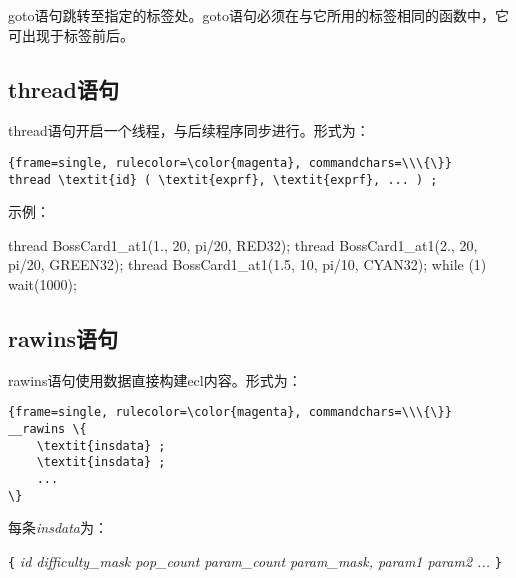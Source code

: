 \documentclass{article}
\begin{document}
goto语句跳转至指定的标签处。goto语句必须在与它所用的标签相同的函数中，它可出现于标签前后。

\subsection{thread语句}

thread语句开启一个线程，与后续程序同步进行。形式为：

\begin{Verbatim}{frame=single, rulecolor=\color{magenta}, commandchars=\\\{\}}
thread \textit{id} ( \textit{exprf}, \textit{exprf}, ... ) ;
\end{Verbatim}

示例：

\begin{MUAvbt}
thread BossCard1_at1(1., 20, pi/20, RED32);
thread BossCard1_at1(2., 20, pi/20, GREEN32);
thread BossCard1_at1(1.5, 10, pi/10, CYAN32);
while (1) wait(1000);
\end{MUAvbt}

\subsection{rawins语句}

rawins语句使用数据直接构建ecl内容。形式为：

\begin{Verbatim}{frame=single, rulecolor=\color{magenta}, commandchars=\\\{\}}
__rawins \{
	\textit{insdata} ;
	\textit{insdata} ;
	...
\}
\end{Verbatim}

每条\textit{insdata}为：

\verb|{| \textit{id difficulty_mask pop_count param_count param_mask, param1 param2 ...} \verb|}|
\end{document}
